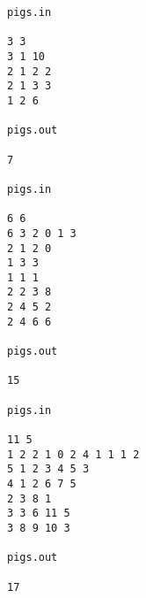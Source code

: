 \begin{verbatim}
pigs.in 
 
3 3 
3 1 10 
2 1 2 2 
2 1 3 3 
1 2 6 
 
pigs.out
 
7 

pigs.in 
 
6 6 
6 3 2 0 1 3 
2 1 2 0 
1 3 3 
1 1 1 
2 2 3 8 
2 4 5 2 
2 4 6 6 
 
pigs.out 
 
15 

pigs.in 
 
11 5 
1 2 2 1 0 2 4 1 1 1 2 
5 1 2 3 4 5 3 
4 1 2 6 7 5 
2 3 8 1 
3 3 6 11 5 
3 8 9 10 3 
 
pigs.out 
 
17  

\end{verbatim}